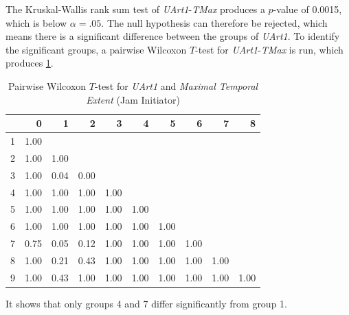 The Kruskal-Wallis rank sum test of \textit{UArt1}-\textit{TMax} produces a $p$-value of 0.0015, which is below $\alpha=.05$. The null hypothesis can therefore be rejected, which means there is a significant difference between the groups of \textit{UArt1}. To identify the significant groups, a pairwise Wilcoxon $T$-test for \textit{UArt1}-\textit{TMax} is run, which produces \cref{tbl:wilcoxon_baysis_initiator_UArt_TMax}. 
\begin{table}[ht]
	\tiny
	\centering
    \begin{tabular}{rrrrrrrrrr}
        \toprule
        & 0 & 1 & 2 & 3 & 4 & 5 & 6 & 7 & 8 \\ 
        \midrule
        1 & 1.00 &  &  &  &  &  &  &  &  \\ 
        2 & 1.00 & 1.00 &  &  &  &  &  &  &  \\ 
        3 & 1.00 & 0.04 & 0.00 &  &  &  &  &  &  \\ 
        4 & 1.00 & 1.00 & 1.00 & 1.00 &  &  &  &  &  \\ 
        5 & 1.00 & 1.00 & 1.00 & 1.00 & 1.00 &  &  &  &  \\ 
        6 & 1.00 & 1.00 & 1.00 & 1.00 & 1.00 & 1.00 &  &  &  \\ 
        7 & 0.75 & 0.05 & 0.12 & 1.00 & 1.00 & 1.00 & 1.00 &  &  \\ 
        8 & 1.00 & 0.21 & 0.43 & 1.00 & 1.00 & 1.00 & 1.00 & 1.00 &  \\ 
        9 & 1.00 & 0.43 & 1.00 & 1.00 & 1.00 & 1.00 & 1.00 & 1.00 & 1.00 \\ 
        \bottomrule
      \end{tabular}
    \caption{Pairwise Wilcoxon $T$-test for \textit{UArt1} and \textit{Maximal Temporal Extent} (Jam Initiator)}
    \label{tbl:wilcoxon_baysis_initiator_UArt_TMax}
\end{table}
It shows that only groups 4 and 7 differ significantly from group 1. 
